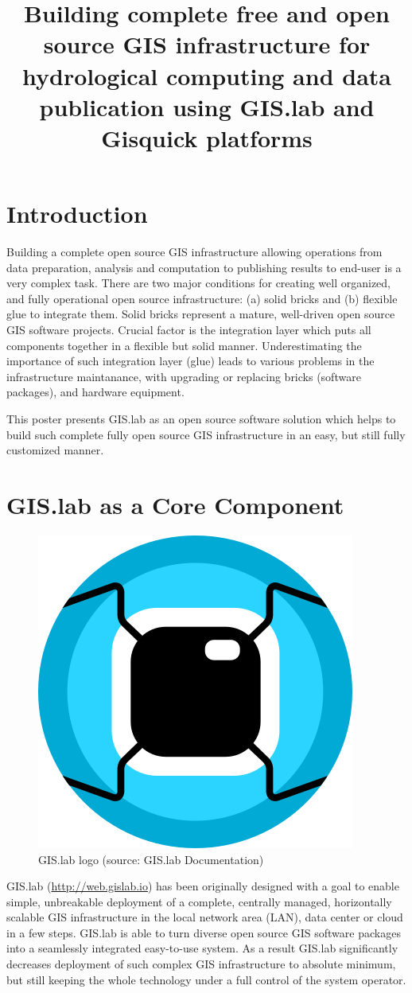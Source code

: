 \documentclass{tudelftposter}
\title{Building complete free and open source GIS infrastructure for
  hydrological computing and data publication using GIS.lab and
  Gisquick platforms}
\begin{document}
\section{Introduction}

Building a complete open source GIS infrastructure allowing operations
from data preparation, analysis and computation to publishing results
to end-user is a very complex task. There are two major conditions for
creating well organized, and fully operational open source
infrastructure: (a) solid bricks and (b) flexible glue to integrate
them. Solid bricks represent a mature, well-driven open source GIS
software projects. Crucial factor is the integration layer which puts
all components together in a flexible but solid
manner. Underestimating the importance of such integration layer
(glue) leads to various problems in the infrastructure maintanance,
with upgrading or replacing bricks (software packages), and hardware
equipment.

This poster presents GIS.lab as an open source software solution which
helps to build such complete fully open source GIS infrastructure in
an easy, but still fully customized manner.

\section{GIS.lab as a Core Component}

\begin{figure}[ht!]
\begin{center}
  \includegraphics[width=.30\columnwidth]{../paper/figures/gislab-logo.png}
  \caption{GIS.lab logo (source: GIS.lab Documentation)}
\label{fig:gislab_logo}
\end{center}
\end{figure}

GIS.lab (\url{http://web.gislab.io}) has been originally designed with
a goal to enable simple, unbreakable deployment of a complete,
centrally managed, horizontally scalable GIS infrastructure in the
local network area (LAN), data center or cloud in a few steps. GIS.lab
is able to turn diverse open source GIS software packages into a
seamlessly integrated easy-to-use system. As a result GIS.lab
significantly decreases deployment of such complex GIS infrastructure
to absolute minimum, but still keeping the whole technology under a
full control of the system operator. 
\end{document}
